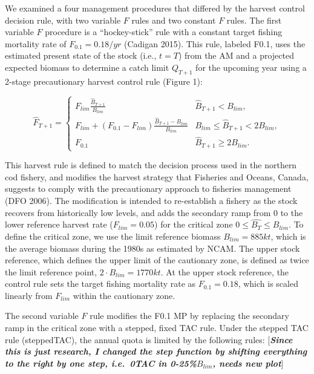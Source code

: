 \documentclass[12pt,]{article}
\begin{document}
We examined a four management procedures that differed by the harvest
control decision rule, with two variable \(F\) rules and two constant
\(F\) rules. The first variable \(F\) procedure is a ``hockey-stick''
rule with a constant target fishing mortality rate of
\(F_{0.1} = 0.18/yr\) (Cadigan 2015). This rule, labeled F0.1, uses the
estimated present state of the stock (i.e., \(t = T\)) from the AM and a
projected expected biomass to determine a catch limit \(Q_{T+1}\) for
the upcoming year using a 2-stage precautionary harvest control rule
(Figure 1):

\begin{equation}
\hat{F}_{T+1} = \left\{ \begin{array}{ll}
                  F_{lim} \frac{\hat{B}_{T+1}}{B_{lim}} & \hat{B}_{T+1} < B_{lim}, \\
                  F_{lim} + (F_{0.1} - F_{lim}) \frac{\hat{B}_{T+1} - B_{lim}}{B_{lim}} & B_{lim} \leq \hat{B}_{T+1} < 2 B_{lim}, \\
                  F_{0.1} & \hat{B}_{T+1} \geq 2 B_{lim}. 
                  \end{array} \right.
\end{equation}

\noindent This harvest rule is defined to match the decision process
used in the northern cod fishery, and modifies the harvest strategy that
Fisheries and Oceans, Canada, suggests to comply with the precautionary
approach to fisheries management (DFO 2006). The modification is
intended to re-establish a fishery as the stock recovers from
historically low levels, and adds the secondary ramp from 0 to the lower
reference harvest rate (\(F_{lim} = 0.05\)) for the critical zone
\(0 \leq \hat{B_T} \leq B_{lim}\). To define the critical zone, we use
the limit reference biomass \(B_{lim} = 885kt\), which is the average
biomass during the 1980s as estimated by NCAM. The upper stock
reference, which defines the upper limit of the cautionary zone, is
defined as twice the limit reference point,
\(2\cdot B_{lim} =  1770kt\). At the upper stock reference, the control
rule sets the target fishing mortality rate as \(F_{0.1} = 0.18\), which
is scaled linearly from \(F_{lim}\) within the cautionary zone.

The second variable \(F\) rule modifies the F0.1 MP by replacing the
secondary ramp in the critical zone with a stepped, fixed TAC rule.
Under the stepped TAC rule (steppedTAC), the annual quota is limited by
the following rules: {[}\textbf{\emph{Since this is just research, I
changed the step function by shifting everything to the right by one
step, i.e.~0TAC in 0-25\%\(B_{lim}\), needs new plot}}{]}
\end{document}
